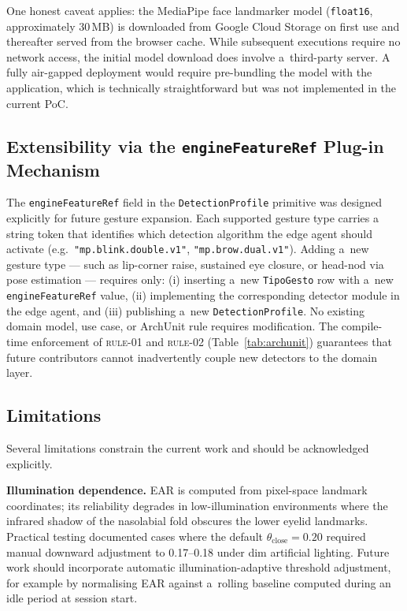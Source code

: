 One honest caveat applies: the MediaPipe face landmarker model (\texttt{float16},
approximately 30\,MB) is downloaded from Google Cloud Storage on first use and
thereafter served from the browser cache. While subsequent executions require no
network access, the initial model download does involve a~third-party server. A fully
air-gapped deployment would require pre-bundling the model with the application, which
is technically straightforward but was not implemented in the current PoC.

\subsection{Extensibility via the \texttt{engineFeatureRef} Plug-in Mechanism}

The \texttt{engineFeatureRef} field in the \texttt{DetectionProfile} primitive was
designed explicitly for future gesture expansion. Each supported gesture type carries a
string token that identifies which detection algorithm the edge agent should activate
(e.g.\ \texttt{"mp.blink.double.v1"}, \texttt{"mp.brow.dual.v1"}). Adding a~new
gesture type — such as lip-corner raise, sustained eye closure, or head-nod via pose
estimation — requires only: (i) inserting a~new \texttt{TipoGesto} row with a~new
\texttt{engineFeatureRef} value, (ii) implementing the corresponding detector module in
the edge agent, and (iii) publishing a~new \texttt{DetectionProfile}. No existing
domain model, use case, or ArchUnit rule requires modification. The compile-time
enforcement of \textsc{rule-01} and \textsc{rule-02} (Table~\ref{tab:archunit})
guarantees that future contributors cannot inadvertently couple new detectors to the
domain layer.

\subsection{Limitations}

Several limitations constrain the current work and should be acknowledged explicitly.

\textbf{Illumination dependence.} EAR is computed from pixel-space landmark
coordinates; its reliability degrades in low-illumination environments where the
infrared shadow of the nasolabial fold obscures the lower eyelid landmarks. Practical
testing documented cases where the default $\theta_\text{close}=0.20$ required
manual downward adjustment to 0.17--0.18 under dim artificial lighting. Future work
should incorporate automatic illumination-adaptive threshold adjustment, for example
by normalising EAR against a~rolling baseline computed during an idle period at
session start.

